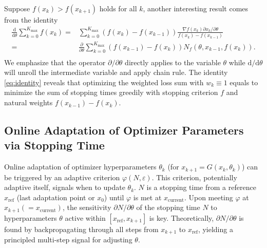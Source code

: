 \documentclass{article}
\begin{document}
Suppose $f(x_k)>f(x_{k+1})$ holds for all $k$, another interesting result comes from the identity
\begin{equation}
\label{eq:identity}
\begin{aligned}
\frac{\mathrm{d}}{\mathrm{d} \theta} \sum_{k=0}^{K_{\max}} f(x_{k}) =&\sum_{k=0}^{K_{\max}}(f(x_{k})-f(x_{k-1}))\frac{\nabla f(x_{k})\partial x_{k}/\partial \theta}{f(x_{k})-f(x_{k-1})}\\
=&\frac{\partial}{\partial\theta}\sum_{k=0}^{K_{\max}}(f(x_{k-1})-f(x_{k}))N_{f}(\theta,x_{k-1},f(x_{k})).\\
\end{aligned}
\end{equation}
We emphasize that the operator $\partial /\partial \theta$ directly applies to the variable $\theta$ while ${\mathrm{d}}/{\mathrm{d} \theta}$ will unroll the intermediate variable and apply chain rule. The identity \eqref{eq:identity} reveals that optimizing the weighted loss sum with $w_k\equiv 1$ equals to minimize the sum of stopping times greedily with stopping criterion $f$ and natural weights $f(x_{k-1})-f(x_{k})$.

\subsection{Online Adaptation of Optimizer Parameters via Stopping Time}
\label{sec:online_adaptation_stopping_time_general}
Online adaptation of optimizer hyperparameters $\theta_k$ (for $x_{k+1} = G(x_k, \theta_k)$) can be triggered by an adaptive criterion $\varphi(N, \varepsilon)$. This criterion, potentially adaptive itself, signals when to update $\theta_k$. $N$ is a stopping time from a reference $x_{\text{ref}}$ (last adaptation point or $x_0$) until $\varphi$ is met at $x_{\text{current}}$. Upon meeting $\varphi$ at $x_{k+1} (=x_{\text{current}})$, the sensitivity $\partial N / \partial \theta$ of the stopping time $N$ to hyperparameters $\theta$ active within $[x_{\text{ref}}, x_{k+1}]$ is key. Theoretically, $\partial N / \partial \theta$ is found by backpropagating through all steps from $x_{k+1}$ to $x_{\text{ref}}$, yielding a principled multi-step signal for adjusting $\theta$.
\end{document}
